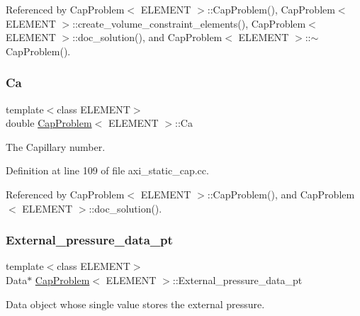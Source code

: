 Referenced by Cap\+Problem$<$ E\+L\+E\+M\+E\+N\+T $>$\+::\+Cap\+Problem(), Cap\+Problem$<$ E\+L\+E\+M\+E\+N\+T $>$\+::create\+\_\+volume\+\_\+constraint\+\_\+elements(), Cap\+Problem$<$ E\+L\+E\+M\+E\+N\+T $>$\+::doc\+\_\+solution(), and Cap\+Problem$<$ E\+L\+E\+M\+E\+N\+T $>$\+::$\sim$\+Cap\+Problem().

\mbox{\label{classCapProblem_ad856df0aa70d881a2b2bc81ad4e2e251}} 
\subsubsection{\texorpdfstring{Ca}{Ca}}
{\footnotesize\ttfamily template$<$class E\+L\+E\+M\+E\+NT$>$ \\
double \hyperlink{classCapProblem}{Cap\+Problem}$<$ E\+L\+E\+M\+E\+NT $>$\+::Ca\hspace{0.3cm}{\ttfamily [private]}}



The Capillary number. 



Definition at line 109 of file axi\+\_\+static\+\_\+cap.\+cc.



Referenced by Cap\+Problem$<$ E\+L\+E\+M\+E\+N\+T $>$\+::\+Cap\+Problem(), and Cap\+Problem$<$ E\+L\+E\+M\+E\+N\+T $>$\+::doc\+\_\+solution().

\mbox{\label{classCapProblem_a3990e9e6a2e4545a470e84ff1fead5eb}} 
\subsubsection{\texorpdfstring{External\+\_\+pressure\+\_\+data\+\_\+pt}{External\_pressure\_data\_pt}}
{\footnotesize\ttfamily template$<$class E\+L\+E\+M\+E\+NT$>$ \\
Data$\ast$ \hyperlink{classCapProblem}{Cap\+Problem}$<$ E\+L\+E\+M\+E\+NT $>$\+::External\+\_\+pressure\+\_\+data\+\_\+pt\hspace{0.3cm}{\ttfamily [private]}}



Data object whose single value stores the external pressure. 



